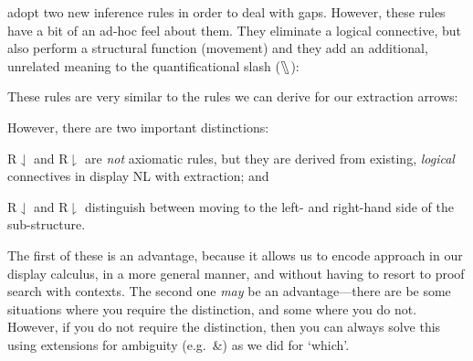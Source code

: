 \citet[][ch.\ 17.10]{barker2015} adopt two new inference rules in
order to deal with gaps. However, these rules have a bit of an ad-hoc
feel about them. They eliminate a logical connective, but also
perform a structural function (movement) and they add an additional,
unrelated meaning to the quantificational slash ($\fatbslash$):
\begin{center}
  \begin{pfbox}
  \end{pfbox}
  \begin{pfbox}
  \end{pfbox}
\end{center}
These rules are very similar to the rules we can derive for our
extraction arrows:
\begin{center}
  \begin{pfbox}
  \end{pfbox}
  \begin{pfbox}
  \end{pfbox}
\end{center}
However, there are two important distinctions:
\begin{enumerate*}[label=(\arabic*)]
\item R${\downharpoonleft}$ and R${\downharpoonright}$ are \emph{not}
  axiomatic rules, but they are derived from existing, \emph{logical}
  connectives in display NL with extraction; and
\item R${\downharpoonleft}$ and R${\downharpoonright}$ distinguish
  between moving to the left- and right-hand side of the
  sub-structure.
\end{enumerate*}
The first of these is an advantage, because it allows us to encode
 approach in our display calculus, in a more
general manner, and without having to resort to proof search with
contexts. The second one \emph{may} be an advantage---there are be
some situations where you require the distinction, and some where you
do not. However, if you do not require the distinction, then you can
always solve this using extensions for ambiguity (e.g.\ \&) as we did
for `which'.
